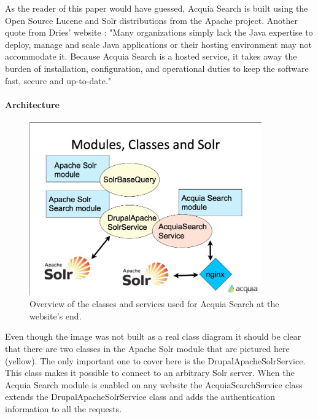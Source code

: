 As the reader of this paper would have guessed, Acquia Search is built using the Open Source Lucene and Solr distributions from the Apache project. Another quote from Dries' website : "Many organizations simply lack the Java expertise to deploy, manage and scale Java applications or their hosting environment may not accommodate it. Because Acquia Search is a hosted service, it takes away the burden of installation, configuration, and operational duties to keep the software fast, secure and up-to-date."

\paragraph{Architecture}
\begin{figure}[H]
     \includegraphics[width=10cm]{images/acquia_solr_classes.jpg}
     \caption{Overview of the classes and services used for Acquia Search at the website's end.}
\end{figure}

Even though the image was not built as a real class diagram it should be clear that there are two classes in the Apache Solr module that are pictured here (yellow). The only important one to cover here is the DrupalApacheSolrService. This class makes it possible to connect to an arbitrary Solr server. When the Acquia Search module is enabled on any website the AcquiaSearchService class extends the DrupalApacheSolrService class and adds the authentication information to all the requests.

